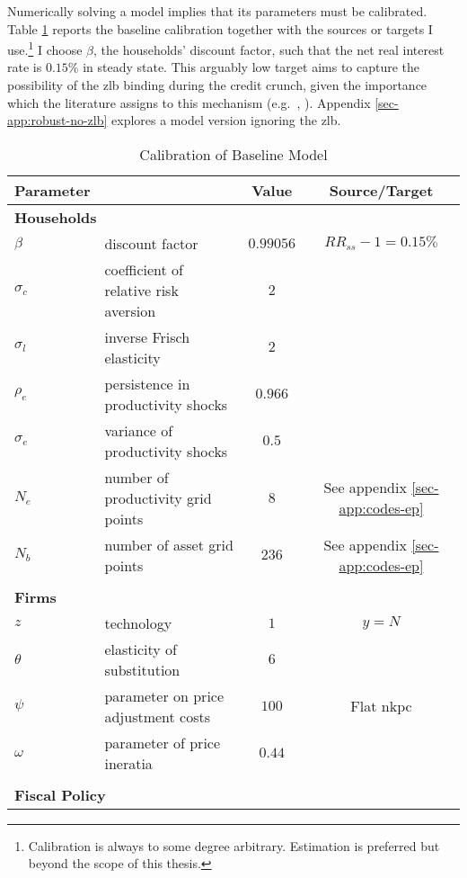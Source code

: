 \documentclass[a4paper,12pt]{article} %
\numberwithin{equation}{section} %
\numberwithin{figure}{section}
\numberwithin{table}{section}
\begin{document}
Numerically solving a model implies that its parameters must be calibrated. Table \ref{tab:calibration-baseline} reports the baseline calibration together with the sources or targets I use.\footnote{Calibration is always to some degree arbitrary. Estimation is preferred but beyond the scope of this thesis.} I choose $\beta$, the households' discount factor, such that the net real interest rate is $0.15\%$ in steady state. This arguably low target aims to capture the possibility of the \Gls{zlb} binding during the credit crunch, given the importance which the literature assigns to this mechanism (e.g.~\cite{egg2012}, \cite{gl2017}). Appendix \ref{sec-app:robust-no-zlb} explores a model version ignoring the \Gls{zlb}.

\begin{table}[t]
\centering
\caption{Calibration of Baseline Model}
\label{tab:calibration-baseline}
\begin{tabular}{llcc}
Parameter &   &  Value & Source/Target \\
\hline
\hline
\multicolumn{2}{l}{\textbf{Households}} & & \\
$\beta$ &  discount factor & $0.99056$ & $RR_{ss}-1 = 0.15\%$ \\
$\sigma_c$ & coefficient of relative risk aversion & $2$ & \textcite{auclert2021} \\
$\sigma_l$ & inverse Frisch elasticity & $2$ & \textcite{auclert2021} \\
$\rho_e$ & persistence in productivity shocks & $0.966$ & \textcite{auclert2021} \\
$\sigma_e$ & variance of productivity shocks & $0.5$ & \textcite{auclert2021} \\
$N_e$ & number of productivity grid points & $8$ & See appendix \ref{sec-app:codes-ep} \\
$N_b$ & number of asset grid points & $236$ & See appendix \ref{sec-app:codes-ep} \\
& & & \\
\multicolumn{2}{l}{\textbf{Firms}} & & \\
$z$ &  technology & $1$ & $y=N$ \\
$\theta$ & elasticity of substitution & $6$ & \textcite{auclert2021} \\
$\psi$ & parameter on price adjustment costs & $100$ & Flat \Gls{nkpc} \\
$\omega$ & parameter of price ineratia & $0.44$ & \textcite{gust2017wp} \\
& & & \\
\multicolumn{2}{l}{\textbf{Fiscal Policy}} & & \\

\end{tabular}
\end{table}
\end{document}
